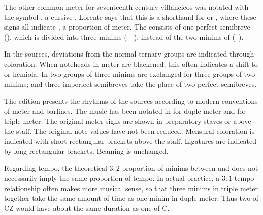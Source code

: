The other common meter for seventeenth-century villancicos was notated with the 
symbol \meterCZorig{}, a cursive \meterCZ{}.
Lorente says that this is a shorthand for \meterCThreeTwo{} or \meterCThree{},
where these signs all indicate , a 
proportion of \meterC{} meter.%
  \autocite[165]{Lorente:Porque}
The  consists of one perfect semibreve (\musSemibreveDotted), which
is divided into three minims (\musMinim\ \musMinim\ \musMinim), instead of the
two minims of \meterC{} (\musMinim\ \musMinim).

In the sources, deviations from the normal ternary groups are indicated through 
coloration. 
When noteheads in \meterCThree{} meter are blackened, this often indicates a
shift to  or hemiola.
In  two groups of three minims are exchanged for three 
groups of two minims; and three imperfect semibreves take the place of two
perfect semibreves.

The edition presents the rhythms of the sources according to modern conventions 
of meter and barlines.
The music has been notated in \meterC{} for duple meter and \meterCThree{}
for triple meter.
The original meter signs are shown in preparatory staves or above the staff.
The original note values have not been reduced.
Mensural coloration is indicated with short rectangular brackets above the 
staff.
Ligatures are indicated by long rectangular brackets.
Beaming is unchanged.

Regarding tempo, the theoretical $3:2$ proportion of minims between
\meterCThreeTwo{} and \meterC{} does not necessarily imply the same proportion of
tempo.  
In actual practice, a $3:1$ tempo relationship often makes more musical sense,
so that three minims in triple meter together take the same amount of time as
one minim in duple meter.
Thus two  of CZ would have about the same duration as one 
 of C.



